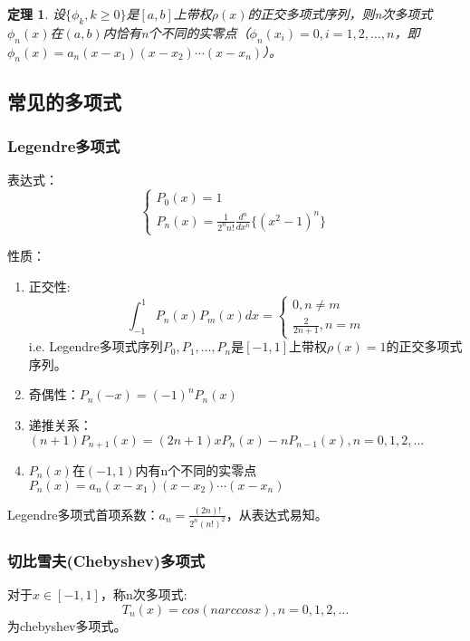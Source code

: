 \documentclass[a4paper]{article}
\newtheorem{theorem}{定理}[section]
\begin{document}
\begin{theorem}
    设$\{\phi_k, k\ge 0\}$是$[a,b]$上带权$\rho(x)$的正交多项式序列，则n次多项式$\phi_n(x)$在$(a,b)$内恰有n个不同的实零点（$\phi_n(x_i)=0, i=1,2, \dots, n$，即$\phi_n(x) = a_n(x-x_1)(x-x_2)\cdots(x-x_n)$）。
\end{theorem}

\subsection{常见的多项式}
\subsubsection{Legendre多项式}
表达式：
\begin{equation}
    \left\{
        \begin{array}{lr}
            P_0(x) = 1 \\
            P_n(x) = \frac{1}{2^nn!}\frac{d^n}{dx^n}\{(x^2-1)^n\}
        \end{array}
        \right.
\end{equation}

性质：
\begin{enumerate}
    \item 正交性: 
    $$\int^1_{-1}P_n(x)P_m(x)dx = \left\{
        \begin{array}{lr}
            0, n\neq m \\
            \frac{2}{2n+1}, n = m
        \end{array}
        \right.$$
        i.e. Legendre多项式序列$P_0, P_1, \dots, P_n$是$[-1,1]$上带权$\rho(x)=1$的正交多项式序列。
    \item 奇偶性：$P_n(-x) = (-1)^nP_n(x)$
    \item 递推关系：$(n+1)P_{n+1}(x) = (2n+1)xP_n(x) - nP_{n-1}(x), n=0,1,2,\dots$
    \item $P_n(x)$在$(-1,1)$内有n个不同的实零点$P_n(x) = a_n(x-x_1)(x-x_2)\cdots(x-x_n)$
\end{enumerate}

Legendre多项式首项系数：$a_n = \frac{(2n)!}{2^n(n!)^2}$，从表达式易知。

\subsubsection{切比雪夫(Chebyshev)多项式}
对于$x\in [-1, 1]$，称n次多项式:
\begin{equation}
    T_n(x) = cos(n arc cos x), n = 0, 1, 2, \dots 
\end{equation}
为chebyshev多项式。
\end{document}
